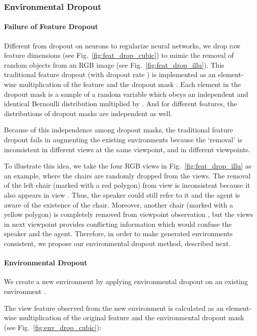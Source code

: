 \documentclass[11pt,a4paper]{article}
\begin{document}
\subsubsection{Environmental Dropout} 
\label{sec:env_drop}
\paragraph{Failure of Feature Dropout}
Different from dropout on neurons to regularize neural networks,
we drop raw feature dimensions (see Fig.~\ref{fig:feat_drop_cubic}) to mimic the removal of random objects from an RGB image (see Fig.~\ref{fig:feat_drop_illu}).
This traditional feature dropout (with dropout rate ) is implemented as an element-wise multiplication of the feature  and the dropout mask .
Each element  in the dropout mask  is a sample of a random variable which obeys an independent and identical Bernoulli distribution multiplied by .
And for different features, the distributions of dropout masks are independent as well.

Because of this independence among dropout masks, the traditional feature dropout fails in augmenting the existing environments because the `removal' is inconsistent in different views at the same viewpoint, and in different viewpoints. 

To illustrate this idea, we take the four RGB views in Fig.~\ref{fig:feat_drop_illu} as an example, where the chairs are randomly dropped from the views.
The removal of the left chair (marked with a red polygon) from view  is inconsistent because it also appears in view .
Thus, the speaker could still refer to it and the agent is aware of the existence of the chair.
Moreover, another chair (marked with a yellow polygon) is completely removed from viewpoint observation , but the views in next viewpoint  provides conflicting information which would confuse the speaker and the agent.
Therefore, in order to make generated environments consistent, we propose our environmental dropout method, described next. 
\paragraph{Environmental Dropout}
We create a new environment  by applying environmental dropout on an existing environment .

The view feature  observed from the new environment  is calculated as an element-wise multiplication of the original feature  and the environmental dropout mask  (see Fig.~\ref{fig:env_drop_cubic}):
\vspace{-5pt}
\end{document}
